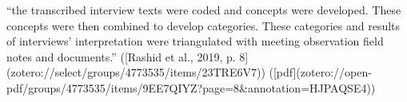 “the transcribed interview texts were coded and concepts were developed. These concepts were then combined to develop categories. These categories and results of interviews’ interpretation were triangulated with meeting observation field notes and documents.” ([Rashid et al., 2019, p. 8](zotero://select/groups/4773535/items/23TRE6V7)) ([pdf](zotero://open-pdf/groups/4773535/items/9EE7QIYZ?page=8&annotation=HJPAQSE4))



